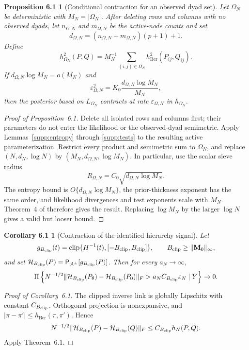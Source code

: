 \documentclass[
  12pt]{article}
\theoremstyle{definition}
\theoremstyle{plain}
\newtheorem*{mainpropobserved}{Proposition 6.1}
\newtheorem*{maincorsignal}{Corollary 6.1}
\newcommand{\calA}{\mathcal A}
\newcommand{\projA}{\mathsf P_{\calA^\perp}}
\newcommand{\bM}{\mathbf M}
\newcommand{\eps}{\varepsilon}
\newcommand{\hBer}{h_{\mathrm{Ber}}}
\DeclareMathOperator{\clip}{clip}
\begin{document}
\begin{mainpropobserved}[Conditional contraction for an observed dyad set]
	Let $\Omega_N$ be deterministic with $M_N=|\Omega_N|$. After deleting rows and columns with no observed dyads, let $n_{\Omega,N}$ and $m_{\Omega,N}$ be the active-node counts and set
	\[
	d_{\Omega,N}=(n_{\Omega,N}+m_{\Omega,N})(p+1)+1.
	\]
	Define
	\[
	h_{\Omega_N}^2(P,Q)=M_N^{-1}\sum_{(i,j)\in\Omega_N}\hBer^2(P_{ij},Q_{ij}).
	\]
	If $d_{\Omega,N}\log M_N=o(M_N)$ and
	\[
	\eps_{\Omega,N}^2=K_0\frac{d_{\Omega,N}\log M_N}{M_N},
	\]
	then the posterior based on $L_{\Omega_N}$ contracts at rate $\eps_{\Omega,N}$ in $h_{\Omega_N}$.
\end{mainpropobserved}

\begin{proof}[Proof of Proposition~6.1]
	Delete all isolated rows and columns first; their parameters do not enter the likelihood or the observed-dyad semimetric. Apply Lemmas~\ref{supp:entropy} through \ref{supp:tests} to the resulting active parameterization. Restrict every product and semimetric sum to $\Omega_N$, and replace $(N,d_N,\log N)$ by $(M_N,d_{\Omega,N},\log M_N)$. In particular, use the scalar sieve radius
	\[
	R_{\Omega,N}=C_0\sqrt{d_{\Omega,N}\log M_N}.
	\]
	The entropy bound is $O\{d_{\Omega,N}\log M_N\}$, the prior-thickness exponent has the same order, and likelihood divergences and test exponents scale with $M_N$. Theorem~4 of \citet{ghosal_2007_ConvergenceRatesPosterior} therefore gives the result. Replacing $\log M_N$ by the larger $\log N$ gives a valid but looser bound.
\end{proof}

\begin{maincorsignal}[Contraction of the identified hierarchy signal]
	Let
	\[
	g_{B_{\rm clip}}(t)=\clip\{H^{-1}(t),[-B_{\rm clip},B_{\rm clip}]\},
	\qquad B_{\rm clip}\ge\|\bM_0\|_\infty,
	\]
	and set $\mathcal H_{B_{\rm clip}}(P)=\projA[g_{B_{\rm clip}}(P)]$. Then for every $a_N\to\infty$,
	\[
	\Pi\left\{N^{-1/2}\|\mathcal H_{B_{\rm clip}}(P_\theta)-\mathcal H_{B_{\rm clip}}(P_0)\|_F
	>a_N C_{B_{\rm clip}}\eps_N\mid Y\right\}\to0.
	\]
\end{maincorsignal}

\begin{proof}[Proof of Corollary~6.1]
	The clipped inverse link is globally Lipschitz with constant $C_{B_{\rm clip}}$. Orthogonal projection is nonexpansive, and $|\pi-\pi'|\le\hBer(\pi,\pi')$. Hence
	\[
	N^{-1/2}\|\mathcal H_{B_{\rm clip}}(P)-\mathcal H_{B_{\rm clip}}(Q)\|_F
	\le C_{B_{\rm clip}}h_N(P,Q).
	\]
	Apply Theorem~6.1.
\end{proof}
\end{document}
